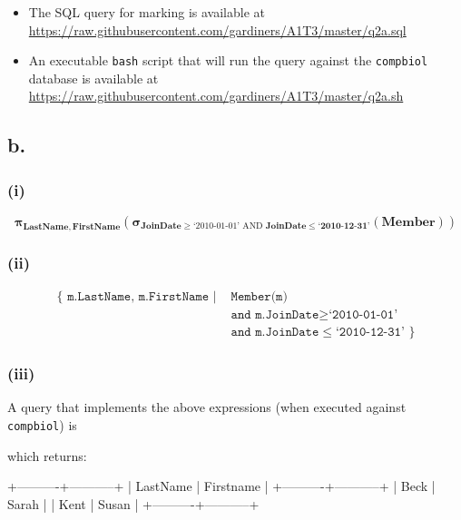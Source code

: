 \documentclass{article}
\newcommand{\select}[1]{
\boldsymbol{\sigma}_{#1}
}
\newcommand{\project}[1]{
\boldsymbol{\pi}_{#1}
}
\begin{document}
\begin{itemize}
    \item The SQL query for marking is available at \url{https://raw.githubusercontent.com/gardiners/A1T3/master/q2a.sql}
    \item An executable \texttt{bash} script that will run the query against the \texttt{compbiol} database is available at \url{https://raw.githubusercontent.com/gardiners/A1T3/master/q2a.sh}
\end{itemize}

\subsection{b.}

\subsubsection{(i)}

$$
\project{\mathbf{LastName, FirstName}}
\left(
\select{\mathbf{JoinDate} \geq \text{`2010-01-01' AND } \mathbf{JoinDate \leq \text{`2010-12-31'}}}
\left(\mathbf{Member}\right)
\right)
$$

\subsubsection{(ii)}

$$
\begin{aligned}
\{
\texttt{ m.LastName, m.FirstName } | &\texttt{ Member(m)} \\
    &\texttt{ and m.JoinDate} \geq \texttt{`2010-01-01'} \\
    &\texttt{ and m.JoinDate} \leq \texttt{`2010-12-31' }
\}
\end{aligned}
$$

\subsubsection{(iii)}

A query that implements the above expressions (when executed against \texttt{compbiol}) is 


which returns:

\begin{bashinline}
+----------+-----------+
| LastName | Firstname |
+----------+-----------+
| Beck     | Sarah     |
| Kent     | Susan     |
+----------+-----------+
\end{bashinline}
\end{document}
